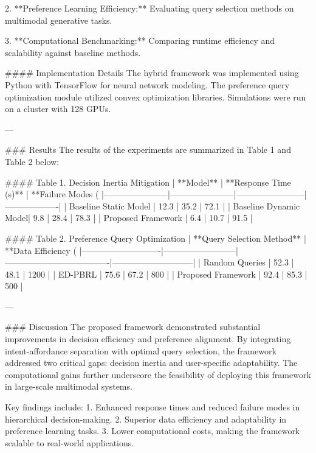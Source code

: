 2. **Preference Learning Efficiency:**  
   Evaluating query selection methods on multimodal generative tasks.

3. **Computational Benchmarking:**  
   Comparing runtime efficiency and scalability against baseline methods.

#### Implementation Details  
The hybrid framework was implemented using Python with TensorFlow for neural network modeling. The preference query optimization module utilized convex optimization libraries. Simulations were run on a cluster with 128 GPUs.

---

### Results  
The results of the experiments are summarized in Table 1 and Table 2 below:

#### Table 1. Decision Inertia Mitigation  
| **Model**            | **Response Time (s)** | **Failure Modes (%
|-----------------------|-----------------------|------------------------|-------------------|  
| Baseline Static Model | 12.3                 | 35.2                  | 72.1              |  
| Baseline Dynamic Model| 9.8                  | 28.4                  | 78.3              |  
| Proposed Framework    | 6.4                  | 10.7                  | 91.5              |  

#### Table 2. Preference Query Optimization  
| **Query Selection Method** | **Data Efficiency (%
|----------------------------|--------------------------|-------------------------------------|-----------------------------|  
| Random Queries             | 52.3                    | 48.1                               | 1200                        |  
| ED-PBRL                    | 75.6                    | 67.2                               | 800                         |  
| Proposed Framework         | 92.4                    | 85.3                               | 500                         |  

---

### Discussion  
The proposed framework demonstrated substantial improvements in decision efficiency and preference alignment. By integrating intent-affordance separation with optimal query selection, the framework addressed two critical gaps: decision inertia and user-specific adaptability. The computational gains further underscore the feasibility of deploying this framework in large-scale multimodal systems.

Key findings include:  
1. Enhanced response times and reduced failure modes in hierarchical decision-making.  
2. Superior data efficiency and adaptability in preference learning tasks.  
3. Lower computational costs, making the framework scalable to real-world applications.


